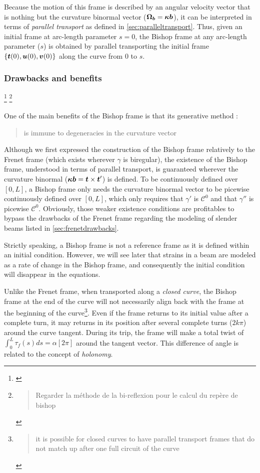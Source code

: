 Because the motion of this frame is described by an angular velocity vector that is nothing but the curvature binormal vector ($\boldsymbol{\Omega_b} = \boldsymbol{\kappa b}$), it can be interpreted in terms of \emph{parallel transport} as defined in \cref{sec:paralleltransport}. Thus, given an initial frame at arc-length parameter $s=0$, the Bishop frame at any arc-length parameter ($s$) is obtained by parallel transporting the initial frame $\{\boldsymbol{t}(0),\boldsymbol{u}(0), \boldsymbol{v}(0)\}$ along the curve from $0$ to $s$.

\subsubsection{Drawbacks and benefits}
\footnote{\cite{Guggenheimer1989, Klok1986, Bloomenthal1990, Wang2008, Poston1995, Menninger2013}}
\footnote{\blockcquote[p.6]{Wang2008}{Regarder la méthode de la bi-reflexion pour le calcul du repère de bishop}}

One of the main benefits of the Bishop frame is that its generative method : \blockcquote{Bloomenthal1990}{is immune to degeneracies in the curvature vector}. Although we first expressed the construction of the Bishop frame relatively to the Frenet frame (which exists wherever $\gamma$ is biregular), the existence of the Bishop frame, understood in terms of parallel transport, is guaranteed wherever the curvature binormal ($\boldsymbol{\kappa b} = \boldsymbol{t} \times \boldsymbol{t}'$) is defined. To be continuously defined over $[0,L]$, a Bishop frame only needs the curvature binormal vector to be picewise continuously defined over  $[0,L]$, which only requires that $\gamma'$ is $\mathcal{C}^0$ and that $\gamma''$ is picewise $\mathcal{C}^0$. Obviously, those weaker existence conditions are profitables to bypass the drawbacks of the Frenet frame regarding the modeling of slender beams listed in \cref{sec:frenetdrawbacks}.

Strictly speaking, a Bishop frame is not a reference frame as it is defined within an initial condition. However, we will see later that strains in a beam are modeled as a rate of change in the Bishop frame, and consequently the initial condition will disappear in the equations.

Unlike the Frenet frame, when transported along a \emph{closed curve}, the Bishop frame at the end of the curve will not necessarily align back with the frame at the beginning of the curve\footnote{\blockcquote{Hanson95}{it is possible for closed curves to have parallel transport frames that do not match up after one full circuit of the curve}}. Even if the frame returns to its initial value after a complete turn, it may returns in its position after several complete turns ($2k\pi$) around the curve tangent. During its trip, the frame will make a total twist of $\int_0^L \tau_f(s)ds = \alpha[2\pi]$ around the tangent vector. This difference of angle is related to the concept of  \emph{holonomy}.

